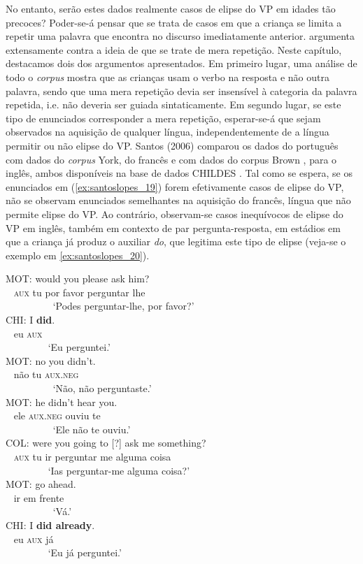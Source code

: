 \documentclass[output=paper]{LSP/langsci}
\begin{document}
No entanto, serão estes dados realmente casos de elipse do VP em idades tão precoces? Poder-se-á pensar que se trata de casos em que a criança se limita a repetir uma palavra que encontra no discurso imediatamente anterior. \citet{santos2006} argumenta extensamente contra a ideia de que se trate de mera repetição. Neste capítulo, destacamos dois dos argumentos apresentados. Em primeiro lugar, uma análise de todo o \textit{corpus} mostra que as crianças usam o verbo na resposta e não outra palavra, sendo que uma mera repetição devia ser insensível à categoria da palavra repetida, i.e. não deveria ser guiada sintaticamente. Em segundo lugar, se este tipo de enunciados corresponder a mera repetição, esperar-se-á que sejam observados na aquisição de qualquer língua, independentemente de a língua permitir ou não elipse do VP. Santos (2006) comparou os dados do português com dados do \textit{corpus} York, do francês \citep{decatplunkett2002,plunkett2002} e com dados do corpus Brown \citep{brown1973}, para o inglês, ambos disponíveis na base de dados CHILDES \citep{macwhinney2000}. Tal como se espera, se os enunciados em (\ref{ex:santoslopes_19}) forem efetivamente casos de elipse do VP, não se observam enunciados semelhantes na aquisição do francês, língua que não permite elipse do VP. Ao contrário, observam-se casos inequívocos de elipse do VP em inglês, também em contexto de par pergunta-resposta, em estádios em que a criança já produz o auxiliar \textit{do}, que legitima este tipo de elipse (veja-se o exemplo em \ref{ex:santoslopes_20}).

\ea\label{ex:santoslopes_20}
\gll MOT: would you please ask him?\\
~ \textsc{aux} tu {por favor} perguntar lhe\\
\glt ~~~~~~~~~ `Podes perguntar-lhe, por favor?'\\
\gll CHI: I \textbf{did}.\\
~ eu \textsc{aux}\\
\glt ~~~~~~~~ `Eu perguntei.'\\
\gll MOT: no you didn't.\\
~ não tu \textsc{aux.neg}\\
\glt ~~~~~~~~~ `Não, não perguntaste.'\\
\gll MOT: he didn't hear you.\\
~ ele \textsc{aux.neg} ouviu te\\
\glt ~~~~~~~~~ `Ele não te ouviu.'\\
\gll COL: were you going {to [?] ask} me something?\\
~ \textsc{aux} tu ir perguntar me {alguma coisa}\\
\glt ~~~~~~~~ `Ias perguntar-me alguma coisa?'\\
\gll MOT: go ahead.\\
~ ir {em frente}\\
\glt ~~~~~~~~~ `Vá.'\\
\gll CHI: I \textbf{did already}.\\
~ eu \textsc{aux} já\\
\glt ~~~~~~~~ `Eu já perguntei.'
\z
\end{document}
